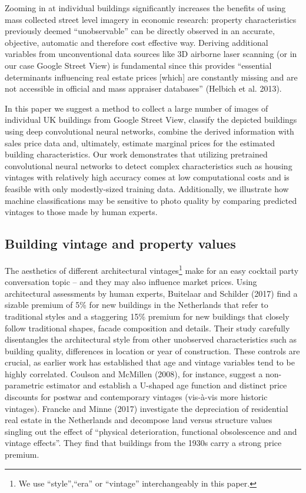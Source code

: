 \documentclass[]{article}
\let\rmarkdownfootnote\footnote%
\def\footnote{\protect\rmarkdownfootnote}
\begin{document}
Zooming in at individual buildings significantly increases the benefits
of using mass collected street level imagery in economic research:
property characteristics previously deemed ``unobservable'' can be
directly observed in an accurate, objective, automatic and therefore
cost effective way. Deriving additional variables from unconventional
data sources like 3D airborne laser scanning (or in our case Google
Street View) is fundamental since this provides ``essential determinants
influencing real estate prices {[}which{]} are constantly missing and
are not accessible in official and mass appraiser databases'' (Helbich
et al. 2013).

In this paper we suggest a method to collect a large number of images of
individual UK buildings from Google Street View, classify the depicted
buildings using deep convolutional neural networks, combine the derived
information with sales price data and, ultimately, estimate marginal
prices for the estimated building characteristics. Our work demonstrates
that utilizing pretrained convolutional neural networks to detect
complex characteristics such as housing vintages with relatively high
accuracy comes at low computational costs and is feasible with only
modestly-sized training data. Additionally, we illustrate how machine
classifications may be sensitive to photo quality by comparing predicted
vintages to those made by human experts.

\hypertarget{building-vintage-and-property-values}{%
\subsection{Building vintage and property
values}\label{building-vintage-and-property-values}}

The aesthetics of different architectural
vintages\footnote{We use ``style'',``era'' or ``vintage'' interchangeably in this paper.}
make for an easy cocktail party conversation topic -- and they may also
influence market prices. Using architectural assessments by human
experts, Buitelaar and Schilder (2017) find a sizable premium of 5\% for
new buildings in the Netherlands that refer to traditional styles and a
staggering 15\% premium for new buildings that closely follow
traditional shapes, facade composition and details. Their study
carefully disentangles the architectural style from other unobserved
characteristics such as building quality, differences in location or
year of construction. These controls are crucial, as earlier work has
established that age and vintage variables tend to be highly correlated.
Coulson and McMillen (2008), for instance, suggest a non-parametric
estimator and establish a U-shaped age function and distinct price
discounts for postwar and contemporary vintages (vis-à-vis more historic
vintages). Francke and Minne (2017) investigate the depreciation of
residential real estate in the Netherlands and decompose land versus
structure values singling out the effect of ``physical deterioration,
functional obsolescence and and vintage effects''. They find that
buildings from the 1930s carry a strong price premium.
\end{document}

